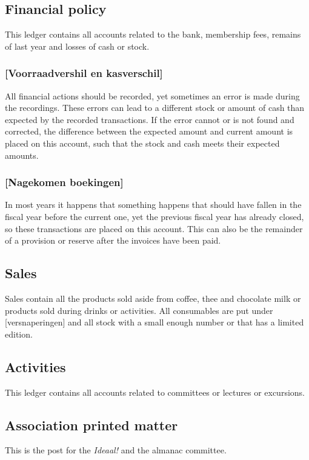 \documentclass{report}
\begin{document}
\subsection{Financial policy}
This ledger contains all accounts related to the bank, membership fees, remains of last year and losses of cash or stock.
\subsubsection{[Voorraadvershil en kasverschil]}
All financial actions should be recorded, yet sometimes an error is made during the recordings. These errors can lead to a different stock or amount of cash than expected by the recorded transactions. If the error cannot or is not found and corrected, the difference between the expected amount and current amount is placed on this account, such that the stock and cash meets their expected amounts. 
\subsubsection{[Nagekomen boekingen]}
In most years it happens that something happens that should have fallen in the fiscal year before the current one, yet the previous fiscal year has already closed, so these transactions are placed on this account. This can also be the remainder of a provision or reserve after the invoices have been paid.  
\subsection{Sales}
Sales contain all the products sold aside from coffee, thee and chocolate milk or products sold during drinks or activities. All consumables are put under [versnaperingen] and all stock with a small enough number or that has a limited edition.     
\subsection{Activities}
This ledger contains all accounts related to committees or lectures or excursions.
\subsection{Association printed matter}
This is the post for the \textit{Ideaal!} and the almanac committee. 
\end{document}
